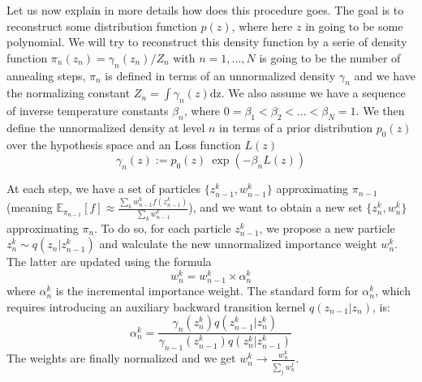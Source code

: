 \documentclass[11pt]{article}
\begin{document}
\begin{itemize}[label=\textbullet]
		Let us now explain in more details how does this procedure goes. The goal is to reconstruct some distribution function $p(z)$, where here $z$ in going to be some polynomial. We will try to reconstruct this density function by a serie of density function $\pi_n(z_n) = \gamma_n(z_n)/Z_n$ with $n = 1,\dots,N$ is going to be the number of annealing steps, $\pi_n$ is defined in terms of an unnormalized density $\gamma_n$ and we have the normalizing constant $Z_n = \int \gamma_n(z) \mathrm{dz}$. We also assume we have a sequence of inverse temperature constants $\beta_n$, where $0 = \beta_1 < \beta_2 <\dots< \beta_N = 1$. We then define the unnormalized density at level $n$ in terms of a prior distribution $p_0(z)$ over the hypothesis space and an Loss function $L(z)$
		\begin{equation}
			\gamma_n(z) := p_0(z) \: \exp \left( -\beta_n L(z) \right)
		\end{equation} 
		
		At each step, we have a set of particles $\{z_{n-1}^k, w_{n-1}^k\}$ approximating $\pi_{n-1}$ (meaning $\mathbb{E}_{\pi_{n-1}}[f] \approx \frac{\sum_k w_{n-1}^k f(z_{n-1}^k)}{\sum_k w_{n-1}^k}$), and we want to obtain a new set $\{z_n^k, w_n^k\}$ approximating $\pi_n$. To do so, for each particle $z^k_{n-1}$, we propose a new particle $z_n^k \sim q(z_n | z_{n-1}^k)$ and walculate the new unnormalized importance weight $w_n^k$. The latter are updated using the formula 
		\begin{equation}
			w_n^k = w_{n-1}^k \times \alpha_{n}^k
		\end{equation}
		where $\alpha_n^k$ is the incremental importance weight. The standard form for $\alpha_n^k$, which requires introducing an auxiliary backward transition kernel $q(z_{n-1} | z_n)$, is:
		\begin{equation}
			\alpha_n^k = \frac{ \gamma_n(z_n^k) q(z_{n-1}^k | z_n^k) }{ \gamma_{n-1}(z_{n-1}^k) q(z_n^k | z_{n-1}^k) } 
		\end{equation}
		The weights are finally normalized and we get $w_n^k \rightarrow \frac{w_n^k}{\sum_j w_n^j}$.
		

\end{itemize}
\end{document}

